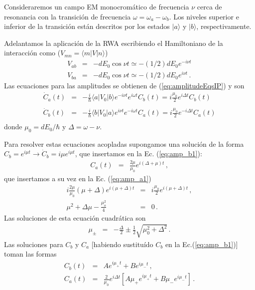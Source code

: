 \documentclass[twocolumn,aps,eqsecnum]{revtex4}
\providecommand{\bra}[1]{\langle #1 \rvert}
\providecommand{\ket}[1]{\lvert #1 \rangle}
\begin{document}
Consideraremos un campo EM monocrom\'atico de frecuencia $\nu$ cerca de resonancia con la transici\'on de frecuencia $\omega =\omega_a - \omega_b$. 
Los niveles superior e inferior de la transici\'on est\'an descritos por los estados 
$\ket{a}$ y $\ket{b}$, respectivamente. 

Adelantamos la aplicaci\'on de la RWA escribiendo el Hamiltoniano de la 
interacci\'on como ($V_{mn} = \bra{m} V \ket{n}$)
%
\begin{eqnarray*} 
V_{ab} &=& -d E_0 \cos{\nu t} 	\simeq 	- (1/2) d E_0 e^{-i \nu t} 	\\
V_{ba} &=& -d E_0 \cos{\nu t} 	\simeq 	- (1/2) d E_0 e^{i \nu t} \,. 
\end{eqnarray*}
Las ecuaciones para las amplitudes se obtienen de (\ref{eq:amplitudeEqsIP}) 
y son 
%
\begin{subequations}
\begin{eqnarray} 
\dot{C}_a (t) &=& - \frac{i}{\hbar} \bra{a} V_0 \ket{b} 
    e^{-i \nu t} e^{i \omega t} C_b (t)
	= i \frac{\mu_0}{2} e^{i \Delta t} C_b (t) 	\label{eq:amp_a1} \nonumber \\ \\ 
\dot{C}_b (t) &=& - \frac{i}{\hbar} \bra{b} V_0 \ket{a} e^{i \nu t} 
	e^{-i \omega t} C_a (t)
	= i \frac{\mu_0}{2} e^{-i \Delta t} C_a (t) 	\label{eq:amp_b1} \nonumber \\ 
\end{eqnarray}
\end{subequations}
donde $\mu_0 = d E_0 /\hbar$ y  $\Delta = \omega -\nu$. 

Para resolver estas ecuaciones acopladas supongamos una soluci\'on de la 
forma $C_b = e^{i \mu t} \to \dot{C}_b = i \mu e^{i \mu t}$, que insertamos en 
la Ec. (\ref{eq:amp_b1}):  
%
\begin{eqnarray} 
C_a (t) &=& \frac{2 \mu}{\mu_0} e^{i (\Delta +\mu)t} \,, \label{eq:amp_a2}  
\end{eqnarray}
que insertamos a su vez en la Ec. (\ref{eq:amp_a1})
%
\begin{eqnarray*} 
i \frac{2 \mu}{\mu_0} (\mu +\Delta) e^{i (\mu + \Delta)t} 
	&=& i \frac{\mu_0}{2} e^{i (\mu + \Delta)t} 	\,, 	\\ 
\mu^2 + \Delta \mu - \frac{\mu_o^2}{4} &=& 0 	\,.
\end{eqnarray*}
Las soluciones de esta ecuaci\'on cuadr\'atica son  
%
\begin{eqnarray} 
\mu_{\pm} &=& -\frac{\Delta}{2} \pm \frac{1}{2} \sqrt{\mu_0^2 +\Delta^2} \,. 
\label{eq:mu_pm}  
\end{eqnarray}
Las soluciones para $C_b$ y $C_a$ [habiendo sustitu\'ido $C_b$ en la 
Ec.(\ref{eq:amp_b1})] toman las formas 
%
\begin{subequations}
\begin{eqnarray} 
C_b (t) &=& A e^{i \mu_+ t} + B e^{i\mu_- t}  \,, \\ %
C_a (t) &=& \frac{2}{\mu_0} e^{i \Delta t} 
	\left[ A \mu_+ e^{i \mu_+ t} + B \mu_- e^{i \mu_- t} \right] \,. 
\end{eqnarray}
\end{subequations}
\end{document}
